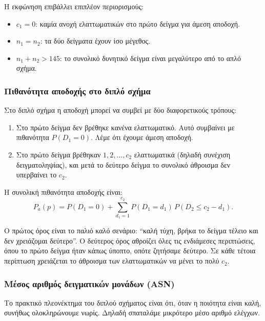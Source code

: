 \documentclass[12pt,a4paper]{article}
\newcommand{\Pa}{P_{\!a}}
\begin{document}
Η εκφώνηση επιβάλλει επιπλέον περιορισμούς:

\begin{itemize}[leftmargin=2.2em]
    \item \(c_1=0\): καμία ανοχή ελαττωματικών στο πρώτο δείγμα για άμεση αποδοχή.
    \item \(n_1=n_2\): τα δύο δείγματα έχουν ίσο μέγεθος.
    \item \(n_1+n_2>145\): το συνολικό δυνητικό δείγμα είναι μεγαλύτερο από
    το απλό σχήμα.
\end{itemize}

\subsubsection*{Πιθανότητα αποδοχής στο διπλό σχήμα}

Στο διπλό σχήμα η αποδοχή μπορεί να συμβεί με δύο διαφορετικούς τρόπους:

\begin{enumerate}[leftmargin=2.2em]
    \item Στο πρώτο δείγμα δεν βρέθηκε κανένα ελαττωματικό. Αυτό συμβαίνει με
    πιθανότητα \(P(D_1=0)\). Λέμε ότι έχουμε άμεση αποδοχή.
    \item Στο πρώτο δείγμα βρέθηκαν \(1,2,\dots,c_2\) ελαττωματικά (δηλαδή
    συνέχιση δειγματοληψίας), και μετά το δεύτερο δείγμα το συνολικό άθροισμα
    δεν υπερβαίνει το \(c_2\).
\end{enumerate}

Η συνολική πιθανότητα αποδοχής είναι:
\[
    \Pa(p)=P(D_1=0)+\sum_{d_1=1}^{c_2}P(D_1=d_1)\,P(D_2\le c_2-d_1).
\]

\begin{intuition}
Ο πρώτος όρος είναι το παλιό καλό σενάριο: ``καλή τύχη, βρήκα το δείγμα
τέλειο και δεν χρειάζομαι δεύτερο''. Ο δεύτερος όρος αθροίζει όλες τις
ενδιάμεσες περιπτώσεις, όπου το πρώτο δείγμα ήταν κάπως ύποπτο, οπότε
ζητήσαμε δεύτερο. Σε κάθε τέτοια περίπτωση χρειάζεται το άθροισμα των
ελαττωματικών να μένει το πολύ \(c_2\).
\end{intuition}

\subsubsection*{Μέσος αριθμός δειγματικών μονάδων (ASN)}

Το πρακτικό πλεονέκτημα του διπλού σχήματος είναι ότι, όταν η ποιότητα είναι
καλή, συνήθως ολοκληρώνουμε νωρίς. Δηλαδή σπαταλάμε μικρότερο μέσο αριθμό
ελέγχων.
\end{document}
